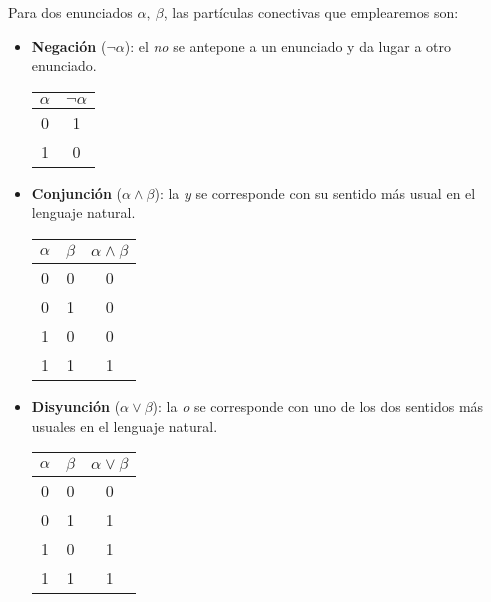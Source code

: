 Para dos enunciados $\alpha,\ \beta$, las partículas conectivas que emplearemos son:
\begin{itemize}
    \item \textbf{Negación} ($\neg \alpha$): el \textit{no} se antepone a un enunciado y da lugar a otro enunciado.
          \begin{center}
              \begin{tabular}{ |c|c|  }
                  \hline
                  $\alpha$ & $\neg \alpha$ \\
                  \hline
                  0        & 1             \\
                  1        & 0             \\
                  \hline
              \end{tabular}
          \end{center}

    \item \textbf{Conjunción} ($\alpha \wedge \beta$): la \textit{y} se corresponde con su sentido más usual en el lenguaje natural.
          \begin{center}
              \begin{tabular}{ |c|c|c|  }
                  \hline
                  $\alpha$ & $\beta$ & $\alpha \wedge \beta$ \\
                  \hline
                  0        & 0       & 0                     \\
                  0        & 1       & 0                     \\
                  1        & 0       & 0                     \\
                  1        & 1       & 1                     \\
                  \hline
              \end{tabular}
          \end{center}

    \item \textbf{Disyunción} ($\alpha \vee \beta$): la \textit{o} se corresponde con uno de los dos sentidos más usuales en el lenguaje natural.
          \begin{center}
              \begin{tabular}{ |c|c|c|  }
                  \hline
                  $\alpha$ & $\beta$ & $\alpha \vee \beta$ \\
                  \hline
                  0        & 0       & 0                   \\
                  0        & 1       & 1                   \\
                  1        & 0       & 1                   \\
                  1        & 1       & 1                   \\
                  \hline
              \end{tabular}
          \end{center}


\end{itemize}
